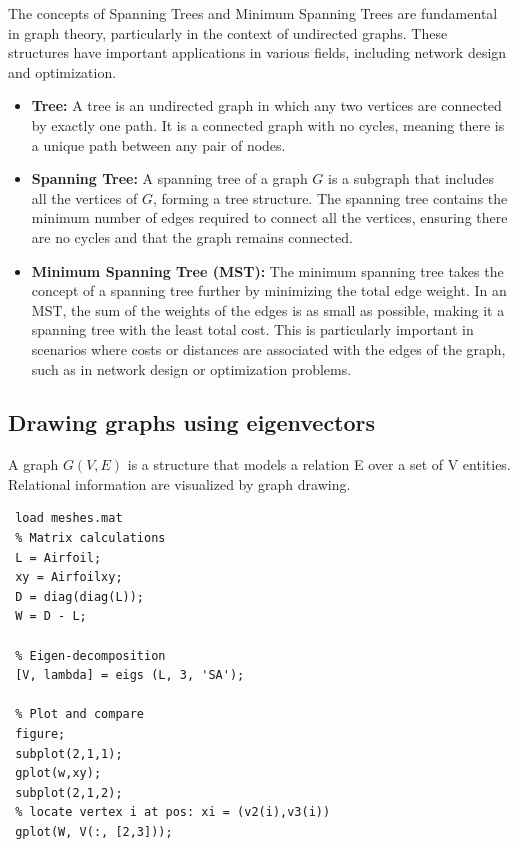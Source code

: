 \documentclass[unicode,11pt,a4paper,oneside,numbers=endperiod,openany]{scrartcl}
\begin{document}
The concepts of Spanning Trees and Minimum Spanning Trees are fundamental in graph theory, particularly in the context of undirected graphs. These structures have important applications in various fields, including network design and optimization.

\begin{itemize}
    \item \textbf{Tree:} A tree is an undirected graph in which any two vertices are connected by exactly one path. It is a connected graph with no cycles, meaning there is a unique path between any pair of nodes.

    \item \textbf{Spanning Tree:} A spanning tree of a graph \( G \) is a subgraph that includes all the vertices of \( G \), forming a tree structure. The spanning tree contains the minimum number of edges required to connect all the vertices, ensuring there are no cycles and that the graph remains connected.

    \item \textbf{Minimum Spanning Tree (MST):} The minimum spanning tree takes the concept of a spanning tree further by minimizing the total edge weight. In an MST, the sum of the weights of the edges is as small as possible, making it a spanning tree with the least total cost. This is particularly important in scenarios where costs or distances are associated with the edges of the graph, such as in network design or optimization problems.
\end{itemize}


\subsection{Drawing graphs using eigenvectors}
A graph $G(V,E)$ is a structure that models a relation E over a set of V entities. Relational information are visualized by graph drawing.
\begin{lstlisting}
 load meshes.mat
 % Matrix calculations
 L = Airfoil;
 xy = Airfoilxy;
 D = diag(diag(L));
 W = D - L;

 % Eigen-decomposition
 [V, lambda] = eigs (L, 3, 'SA');

 % Plot and compare
 figure;
 subplot(2,1,1);
 gplot(w,xy);
 subplot(2,1,2);
 % locate vertex i at pos: xi = (v2(i),v3(i))
 gplot(W, V(:, [2,3]));
\end{lstlisting}
\end{document}
